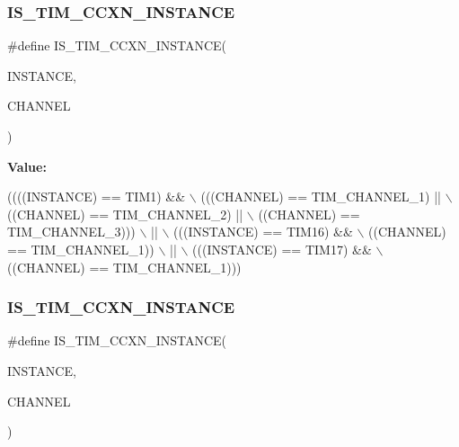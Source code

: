 \subsubsection{\texorpdfstring{I\+S\+\_\+\+T\+I\+M\+\_\+\+C\+C\+X\+N\+\_\+\+I\+N\+S\+T\+A\+N\+CE}{IS\_TIM\_CCXN\_INSTANCE}\hspace{0.1cm}{\footnotesize\ttfamily [5/16]}}
{\footnotesize\ttfamily \#define I\+S\+\_\+\+T\+I\+M\+\_\+\+C\+C\+X\+N\+\_\+\+I\+N\+S\+T\+A\+N\+CE(\begin{DoxyParamCaption}\item[{}]{I\+N\+S\+T\+A\+N\+CE,  }\item[{}]{C\+H\+A\+N\+N\+EL }\end{DoxyParamCaption})}

{\bfseries Value\+:}
\begin{DoxyCode}
((((INSTANCE) == TIM1) &&                    \(\backslash\)
     (((CHANNEL) == TIM\_CHANNEL\_1) ||           \(\backslash\)
      ((CHANNEL) == TIM\_CHANNEL\_2) ||           \(\backslash\)
      ((CHANNEL) == TIM\_CHANNEL\_3)))            \(\backslash\)
    ||                                          \(\backslash\)
    (((INSTANCE) == TIM16) &&                   \(\backslash\)
     ((CHANNEL) == TIM\_CHANNEL\_1))              \(\backslash\)
    ||                                          \(\backslash\)
    (((INSTANCE) == TIM17) &&                   \(\backslash\)
     ((CHANNEL) == TIM\_CHANNEL\_1)))
\end{DoxyCode}
\mbox{\label{group___exported__macro_ga7181cfd1649c4e65e24b7c863e94a54f}} 
\subsubsection{\texorpdfstring{I\+S\+\_\+\+T\+I\+M\+\_\+\+C\+C\+X\+N\+\_\+\+I\+N\+S\+T\+A\+N\+CE}{IS\_TIM\_CCXN\_INSTANCE}\hspace{0.1cm}{\footnotesize\ttfamily [6/16]}}
{\footnotesize\ttfamily \#define I\+S\+\_\+\+T\+I\+M\+\_\+\+C\+C\+X\+N\+\_\+\+I\+N\+S\+T\+A\+N\+CE(\begin{DoxyParamCaption}\item[{}]{I\+N\+S\+T\+A\+N\+CE,  }\item[{}]{C\+H\+A\+N\+N\+EL }\end{DoxyParamCaption})}


